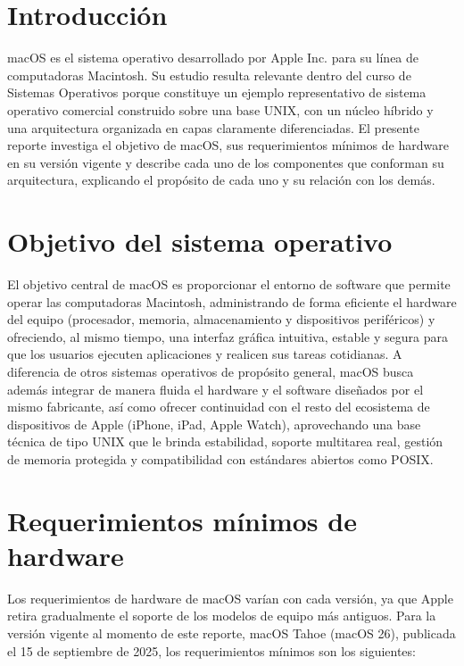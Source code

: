 \documentclass[12pt,letterpaper]{article}
\begin{document}
\section{Introducción}

macOS es el sistema operativo desarrollado por Apple Inc. para su línea de computadoras Macintosh. Su estudio resulta relevante dentro del curso de Sistemas Operativos porque constituye un ejemplo representativo de sistema operativo comercial construido sobre una base UNIX, con un núcleo híbrido y una arquitectura organizada en capas claramente diferenciadas. El presente reporte investiga el objetivo de macOS, sus requerimientos mínimos de hardware en su versión vigente y describe cada uno de los componentes que conforman su arquitectura, explicando el propósito de cada uno y su relación con los demás.

\section{Objetivo del sistema operativo}

El objetivo central de macOS es proporcionar el entorno de software que permite operar las computadoras Macintosh, administrando de forma eficiente el hardware del equipo (procesador, memoria, almacenamiento y dispositivos periféricos) y ofreciendo, al mismo tiempo, una interfaz gráfica intuitiva, estable y segura para que los usuarios ejecuten aplicaciones y realicen sus tareas cotidianas. A diferencia de otros sistemas operativos de propósito general, macOS busca además integrar de manera fluida el hardware y el software diseñados por el mismo fabricante, así como ofrecer continuidad con el resto del ecosistema de dispositivos de Apple (iPhone, iPad, Apple Watch), aprovechando una base técnica de tipo UNIX que le brinda estabilidad, soporte multitarea real, gestión de memoria protegida y compatibilidad con estándares abiertos como POSIX.

\section{Requerimientos mínimos de hardware}

Los requerimientos de hardware de macOS varían con cada versión, ya que Apple retira gradualmente el soporte de los modelos de equipo más antiguos. Para la versión vigente al momento de este reporte, macOS Tahoe (macOS 26), publicada el 15 de septiembre de 2025, los requerimientos mínimos son los siguientes:
\end{document}

